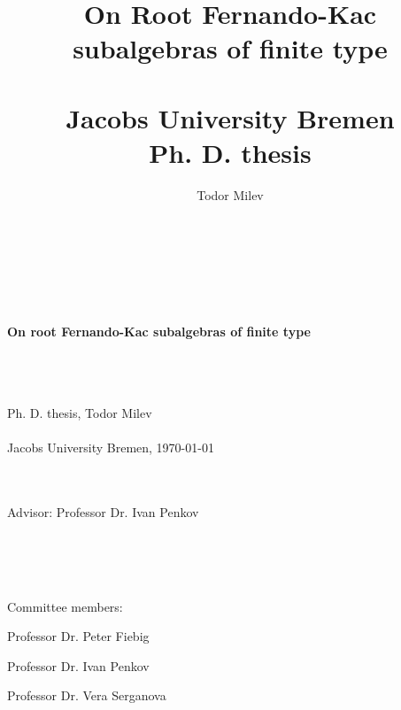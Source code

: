 \documentclass[12pt]{report}
\author{Todor Milev}
\title{On Root Fernando-Kac subalgebras of finite type \\~ \\ \Large Jacobs University Bremen \\\normalsize Ph. D. thesis}
\begin{document}
\begin{center}
\Huge{
~\\~\\~\\~\\
\textbf{On root Fernando-Kac subalgebras of finite type }
}

~\\~\\~\\

\Large  {Ph. D. thesis, Todor Milev}
~\\~\\

\Large { Jacobs University Bremen, \today} 

~\\~\\

\Large Advisor: {Professor Dr. Ivan Penkov}

~\\~\\~\\
\end{center}
\Large
Committee members:

\noindent Professor Dr. Peter Fiebig

\noindent Professor Dr. Ivan Penkov

\noindent Professor Dr. Vera Serganova

\normalsize
\thispagestyle{empty}

\newpage
~\\~\\~\\~\\~\\~\\~\\~\\~\\~\\~\\~\\~\\~\\~\\~\\~\\~\\~\\~\\~\\~\\~\\~\\~\\~\\~\\~\\~\\~\\~\\~\\~\\~\\
\end{document}
